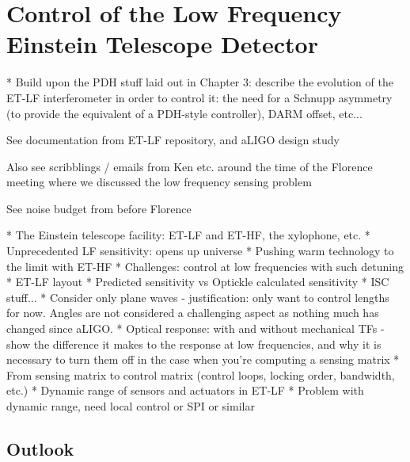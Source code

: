 \chapter{Control of the Low Frequency Einstein Telescope Detector}
\label{c:et-lf-control}

  * Build upon the PDH stuff laid out in Chapter 3: describe the evolution of the ET-LF interferometer in order to control it: the need for a Schnupp asymmetry (to provide the equivalent of a PDH-style controller), DARM offset, etc...
  
  See documentation from ET-LF repository, and aLIGO design study
  
  Also see scribblings / emails from Ken etc. around the time of the Florence meeting where we discussed the low frequency sensing problem
  
  See noise budget from before Florence

  * The Einstein telescope facility: ET-LF and ET-HF, the xylophone, etc.
    * Unprecedented LF sensitivity: opens up universe
    * Pushing warm technology to the limit with ET-HF
    * Challenges: control at low frequencies with such detuning
  * ET-LF layout
  * Predicted sensitivity vs Optickle calculated sensitivity
  * ISC stuff...
    * Consider only plane waves - justification: only want to control lengths for now. Angles are not considered a challenging aspect as nothing much has changed since aLIGO.
    * Optical response: with and without mechanical TFs - show the difference it makes to the response at low frequencies, and why it is necessary to turn them off in the case when you're computing a sensing matrix
    * From sensing matrix to control matrix (control loops, locking order, bandwidth, etc.)
    * Dynamic range of sensors and actuators in ET-LF
      * Problem with dynamic range, need local control or SPI or similar

\section{Outlook}